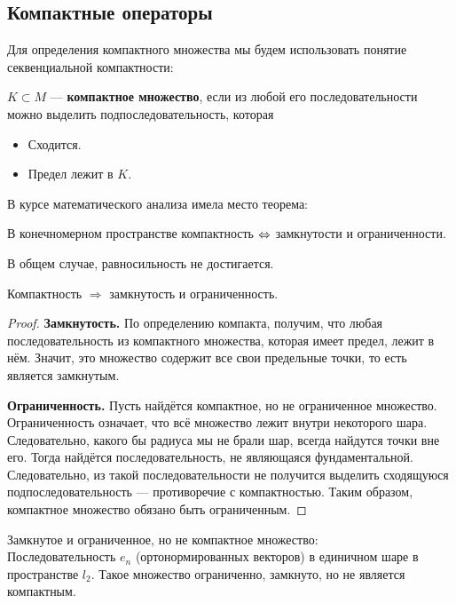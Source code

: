 \documentclass[12pt]{article}
\begin{document}
	\subsection{Компактные операторы}
	
		Для определения компактного множества мы будем использовать понятие секвенциальной компактности:
		\begin{defi}
			$K \subset M$ --- \textbf{компактное множество}, если из любой его последовательности можно выделить подпоследовательность,
			которая
			\begin{itemize}
				\item Сходится.
				\item Предел лежит в $K$.
			\end{itemize}
		\end{defi}
	
		В курсе математического анализа имела место теорема:
	
		\begin{theorem}
			В конечномерном пространстве компактность $\Leftrightarrow$ замкнутости и ограниченности.
		\end{theorem}
	
		В общем случае, равносильность не достигается.
	
		\begin{theorem}
			Компактность $\Rightarrow$ замкнутость и ограниченность.
		\end{theorem}
		\begin{proof}
			\textbf{Замкнутость.} По определению компакта, получим, что любая последовательность из 
			компактного множества, которая имеет предел, лежит в нём. Значит, это множество содержит все свои предельные точки, то есть 
			является замкнутым.
		
			\textbf{Ограниченность.} Пусть найдётся компактное, но не ограниченное множество. Ограниченность означает, что всё множество
			лежит внутри некоторого шара. Следовательно, какого бы радиуса мы не брали шар, всегда найдутся точки вне его. Тогда
			найдётся последовательность, не являющаяся фундаментальной. Следовательно, из такой последовательности не получится выделить
			сходящуюся подпоследовательность --- противоречие с компактностью. Таким образом, компактное множество обязано быть ограниченным.
		\end{proof}
	
		\example Замкнутое и ограниченное, но не компактное множество: \\
		Последовательность $e_n$ (ортонормированных векторов) в единичном шаре в пространстве $l_2$. Такое множество ограниченно, 
		замкнуто, но не является компактным.
	
\end{document}
